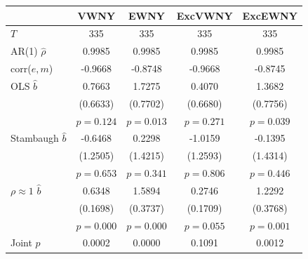 \begin{tabular}{lcccc}
\toprule
 & VWNY & EWNY & ExcVWNY & ExcEWNY \\
\midrule
$T$ & 335 & 335 & 335 & 335 \\
AR(1) $\hat\rho$ & 0.9985 & 0.9985 & 0.9985 & 0.9985 \\
corr($e,m$) & -0.9668 & -0.8748 & -0.9668 & -0.8745 \\
\midrule
OLS $\hat b$ & 0.7663 & 1.7275 & 0.4070 & 1.3682 \\
 & (0.6633) & (0.7702) & (0.6680) & (0.7756) \\
 & $p=0.124$ & $p=0.013$ & $p=0.271$ & $p=0.039$ \\
Stambaugh $\hat b$ & -0.6468 & 0.2298 & -1.0159 & -0.1395 \\
 & (1.2505) & (1.4215) & (1.2593) & (1.4314) \\
 & $p=0.653$ & $p=0.341$ & $p=0.806$ & $p=0.446$ \\
$\rho\approx1$ $\hat b$ & 0.6348 & 1.5894 & 0.2746 & 1.2292 \\
 & (0.1698) & (0.3737) & (0.1709) & (0.3768) \\
 & $p=0.000$ & $p=0.000$ & $p=0.055$ & $p=0.001$ \\
\midrule
Joint $p$ & 0.0002 & 0.0000 & 0.1091 & 0.0012 \\
\bottomrule
\end{tabular}
